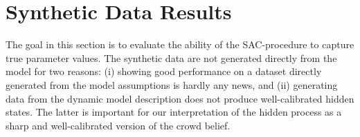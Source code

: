 \documentclass[aoas, preprint]{imsart}
\numberwithin{equation}{section}
\theoremstyle{plain}
\begin{document}

\section{Synthetic Data Results}
\label{syntheticData}

The goal in this section is to evaluate the ability of the SAC-procedure to capture true parameter values. The synthetic data are not generated directly from the model for two reasons: (i) showing good performance on a dataset directly generated from the model assumptions is hardly any news, and (ii) generating data from the dynamic model description does not produce well-calibrated hidden states. The latter is important for our interpretation of the hidden process as a sharp and well-calibrated version of the crowd belief. 
\end{document}
